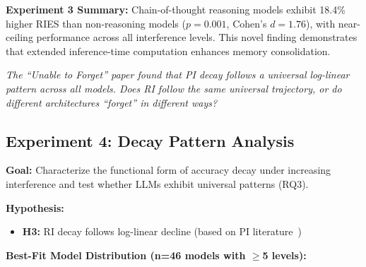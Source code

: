 \documentclass{article}
\begin{document}
\textbf{Experiment 3 Summary:} Chain-of-thought reasoning models exhibit 18.4\% higher RIES than non-reasoning models ($p = 0.001$, Cohen's $d = 1.76$), with near-ceiling performance across all interference levels. This novel finding demonstrates that extended inference-time computation enhances memory consolidation.

\vspace{3pt}
\noindent\textit{The ``Unable to Forget'' paper found that PI decay follows a universal log-linear pattern across all models. Does RI follow the same universal trajectory, or do different architectures ``forget'' in different ways?}
\vspace{3pt}

\subsection{Experiment 4: Decay Pattern Analysis}
\label{exp:decay}

\textbf{Goal:} Characterize the functional form of accuracy decay under increasing interference and test whether LLMs exhibit universal patterns (RQ3).

\textbf{Hypothesis:}
\begin{itemize}[itemsep=2pt,topsep=3pt,parsep=0pt]
    \item \textbf{H3:} RI decay follows log-linear decline (based on PI literature~\citep{liu2024unable})
\end{itemize}

\textbf{Best-Fit Model Distribution (n=46 models with $\geq$5 levels):}
\end{document}

